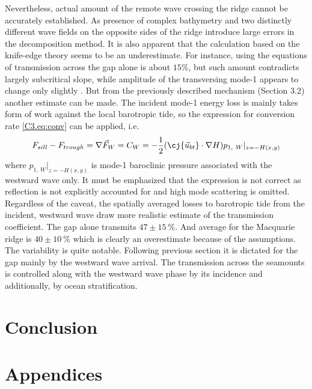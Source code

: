 \documentclass[12pt]{article}
\begin{document}
Nevertheless, actual amount of the remote wave crossing the ridge cannot be accurately established. 
As presence of complex bathymetry and two distinctly different wave fields on the opposite sides of 
the ridge introduce large errors in the decomposition method. It is also apparent that the 
calculation based on the knife-edge theory seems to be an underestimate. For instance, 
using the equations of \citep{larsen1969internal} transmission across the gap alone is about 
$15\%$, but such amount contradicts largely subcritical slope, while amplitude of the transversing 
mode-1 appears to change only slightly . But from the previously 
described mechanism (Section 3.2) another estimate can be made. The incident mode-1 energy loss is 
mainly takes form of work against the local barotropic tide, so the expression for conversion rate 
\eqref{C3.eq:conv} can be applied, i.e.
\begin{equation}
F_{sill} - F_{trough} = \nabla \vec{F}_W = C_W = -\frac{1}{2}(\cj{\vec{u}_{bt}} \cdot \nabla H) 
p_{1,~W}|_{z = -H(x,y)}
\end{equation}
where $p_{1,~W}|_{z = -H(x,y)}$ is mode-1 baroclinic pressure associated with the westward wave 
only. It must be emphasized that the expression is not correct as reflection is not explicitly 
accounted for and high mode scattering is omitted. Regardless of the caveat, the spatially averaged 
losses to barotropic tide from the incident, westward wave  draw more 
realistic estimate of the transmission coefficient. The gap alone transmits $47 \pm 15~\%$. And 
average for the Macquarie ridge is $40 \pm 10~\%$ which is clearly an overestimate because of the 
assumptions. The variability is quite notable. Following previous section it is dictated for 
the gap mainly by the westward wave arrival. The transmission across the seamounts is controlled 
along with the westward wave phase by its incidence and additionally, by ocean stratification.\\

\section{Conclusion}

\section*{Appendices}

\renewcommand{\thesubsection}{\Alph{subsection}}
\setcounter{subsection}{0}
\end{document}
